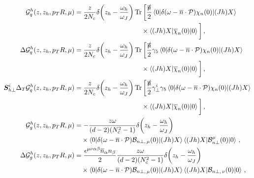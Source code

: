 \documentclass[a4paper, 11 pt]{article}
\begin{document}
\begin{align}
\mathcal{G}_q^h \pqty{z, z_h, p_TR, \mu}
& =
\frac{z}{2 N_c} \delta \pqty{z_h - \frac{\omega _h}{\omega _J}}\Tr \bigg[\frac{\slashed{\overline{n}}}{2}
\mel**{0}{\delta \pqty{\omega - \overline{n} \cdot \mathcal{P}} \chi _n \pqty{0}}{\pqty{Jh} X}
\nonumber \\
& \qquad \qquad \qquad \qquad \qquad \times
\mel**{\pqty{Jh} X}{\overline{\chi}_n \pqty{0}}{0} \bigg]
\, , \label{e.collinear_FJFs_q} \\
\Delta \mathcal{G}_q^h \pqty{z, z_h, p_TR, \mu}
& =
\frac{z}{2N_c} \delta \pqty{z_h - \frac{\omega _h}{\omega _J}} \Tr \bigg[\frac{\slashed{\overline{n}}}{2} \gamma _5\mel**{0}{\delta \pqty{\omega - \overline{n} \cdot \mathcal{P}} \chi _n \pqty{0}}{\pqty{Jh} X}
\nonumber \\
& \qquad \qquad \qquad \qquad \qquad \times
\mel**{\pqty{Jh} X}{\overline{\chi}_n \pqty{0}}{0} \bigg]
\, , \label{e.collinear_Delta_FJFs_q} \\
\boldsymbol{S}_{h\perp}^i \Delta _T \mathcal{G}_q^h \pqty{z, z_h, p_TR, \mu}
& =
\frac{z}{2 N_c} \delta \pqty{z_h - \frac{\omega _h}{\omega _J}} \Tr \bigg[\frac{\slashed{\overline{n}}}{2} \gamma _{\perp}^i\gamma _5
\mel**{0}{\delta \pqty{\omega - \overline{n} \cdot \mathcal{P}} \chi _n \pqty{0}}{\pqty{Jh} X}
\nonumber \\
& \qquad \qquad \qquad \qquad \qquad \times
\mel**{\pqty{Jh} X}{\overline{\chi}_n \pqty{0}}{0}\bigg]
\, , \label{e.collinear_Delta_T_FJFs_q} \\
\mathcal{G}_g^h \pqty{z, z_h, p_TR, \mu}
& =
- \frac{z \omega}{\pqty{d - 2} \pqty{N_c^2 - 1}} \delta \pqty{z_h - \frac{\omega _h}{\omega _J}}
\nonumber \\
& \quad \times
\mel**{0}{\delta \pqty{\omega - \overline{n} \cdot \mathcal{P}} \mathcal{B}_{n \perp , \, \mu} \pqty{0}}{\pqty{Jh} X}
\mel**{\pqty{Jh} X}{\mathcal{B}_{n \perp}^{\mu} \pqty{0}}{0}
\, , \label{e.collinear_FJFs_g}\\
\Delta \mathcal{G}_g^h \pqty{z, z_h, p_TR, \mu}
& =
\frac{\epsilon^{\mu\nu\alpha\beta}\overline{n}_\alpha n_\beta}{2}\frac{z \omega}{\pqty{d - 2}\pqty{N_c^2 - 1}} \delta \pqty{z_h - \frac{\omega _h}{\omega _J}}
\nonumber \\
& \quad \times
\mel**{0}{\delta \pqty{\omega - \overline{n} \cdot \mathcal{P}} \mathcal{B}_{n \perp , \, \mu} \pqty{0}}{\pqty{Jh} X}
\mel**{\pqty{Jh} X}{\mathcal{B}_{n \perp , \, \nu}\pqty{0}}{0}
\, , \label{e.collinear_Delta_FJFs_g}
\end{align}
\end{document}
